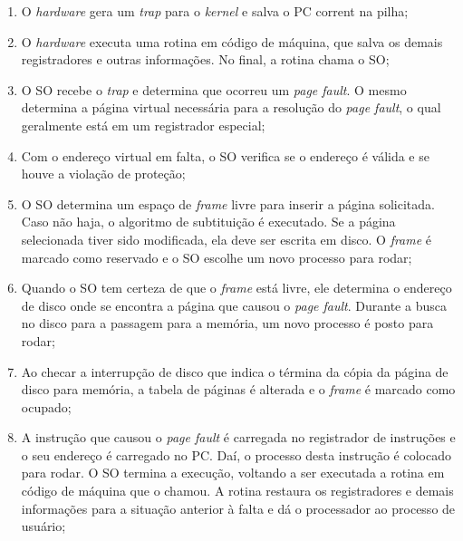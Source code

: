 \begin{enumerate}
  \item O \textit{hardware} gera um \textit{trap} para o \textit{kernel} e salva o PC corrent na pilha;

  \item O \textit{hardware} executa uma rotina em código de máquina, que salva os demais registradores e outras informações. No final, a rotina chama o SO;

  \item O SO recebe o \textit{trap} e determina que ocorreu um \textit{page fault}. O mesmo determina a página virtual necessária para a resolução do \textit{page fault}, o qual geralmente está em um registrador especial;

  \item Com o endereço virtual em falta, o SO verifica se o endereço é válida e se houve a violação de proteção;

  \item O SO determina um espaço de \textit{frame} livre para inserir a página solicitada. Caso não haja, o algoritmo de subtituição é executado. Se a página selecionada tiver sido modificada, ela deve ser escrita em disco. O \textit{frame} é marcado como reservado e o SO escolhe um novo processo para rodar;

  \item Quando o SO tem certeza de que o \textit{frame} está livre, ele determina o endereço de disco onde se encontra a página que causou o \textit{page fault}. Durante a busca no disco para a passagem para a memória, um novo processo é posto para rodar;

  \item Ao checar a interrupção de disco que indica o términa da cópia da página de disco para memória, a tabela de páginas é alterada e o \textit{frame} é marcado como ocupado;

  \item A instrução que causou o \textit{page fault} é carregada no registrador de instruções e o seu endereço é carregado no PC. Daí, o processo desta instrução é colocado para rodar. O SO termina a execução, voltando a ser executada a rotina em código de máquina que o chamou. A rotina restaura os registradores e demais informações para a situação anterior à falta e dá o processador ao processo de usuário;

\end{enumerate}

